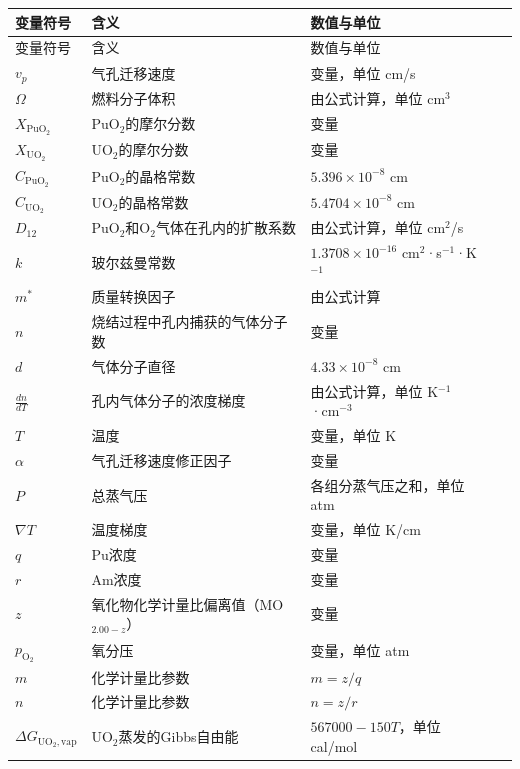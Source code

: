 	\begin{xltabular}{\textwidth}{>{\centering\arraybackslash{}\hsize}X 
			>{\RaggedRight\arraybackslash{}\hsize}X 
			>{\centering\arraybackslash{}\hsize}X}
		\toprule
		变量符号 & 含义 & 数值与单位 \\
		\midrule
		\endfirsthead
		
		\toprule
		变量符号 & 含义 & 数值与单位 \\
		\midrule
		\endhead
		\midrule
		\endfoot
		\bottomrule
		\endlastfoot
		$v_p$ & 气孔迁移速度 & 变量，单位 cm/s \\
		$\Omega$ & 燃料分子体积 & 由公式计算，单位 cm$^3$ \\
		$X_{\text{PuO}_2}$ & PuO$_2$的摩尔分数 & 变量 \\
		$X_{\text{UO}_2}$ & UO$_2$的摩尔分数 & 变量 \\
		$C_{\text{PuO}_2}$ & PuO$_2$的晶格常数 & $5.396 \times 10^{-8}$ cm \\
		$C_{\text{UO}_2}$ & UO$_2$的晶格常数 & $5.4704 \times 10^{-8}$ cm \\
		$D_{12}$ & PuO$_2$和O$_2$气体在孔内的扩散系数 & 由公式计算，单位 cm$^2$/s \\
		$k$ & 玻尔兹曼常数 & $1.3708 \times 10^{-16}$ cm$^2$·s$^{-1}$·K$^{-1}$ \\
		$m^*$ & 质量转换因子 & 由公式计算 \\
		$n$ & 烧结过程中孔内捕获的气体分子数 & 变量 \\
		$d$ & 气体分子直径 & $4.33 \times 10^{-8}$ cm \\
		$\frac{dn}{dT}$ & 孔内气体分子的浓度梯度 & 由公式计算，单位 K$^{-1}$·cm$^{-3}$ \\
		$T$ & 温度 & 变量，单位 K \\
		$\alpha$ & 气孔迁移速度修正因子 & 变量 \\
		$P$ & 总蒸气压 & 各组分蒸气压之和，单位 atm \\
		$\nabla T$ & 温度梯度 & 变量，单位 K/cm \\
		$q$ & Pu浓度 & 变量 \\
		$r$ & Am浓度 & 变量 \\
		$z$ & 氧化物化学计量比偏离值（MO$_{2.00 - z}$） & 变量 \\
		$p_{\text{O}_2}$ & 氧分压 & 变量，单位 atm \\
		$m$ & 化学计量比参数 & $m = z/q$ \\
		$n$ & 化学计量比参数 & $n = z/r$ \\
		$\Delta G_{\text{UO}_2,\text{vap}}$ & UO$_2$蒸发的Gibbs自由能 & $567000 - 150T$，单位 cal/mol \\

\end{xltabular}
